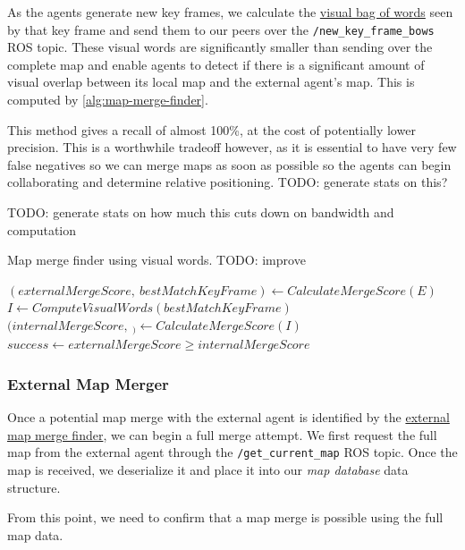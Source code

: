 As the agents generate new key frames, we calculate the \hyperref[sec:visual-bag-of-words]{visual bag of words} seen by that key frame and send them to our peers over the \texttt{/new\_key\_frame\_bows} ROS topic. These visual words are significantly smaller than sending over the complete map and enable agents to detect if there is a significant amount of visual overlap between its local map and the external agent's map. This is computed by \autoref{alg:map-merge-finder}.

This method gives a recall of almost 100\%, at the cost of potentially lower precision. This is a worthwhile tradeoff however, as it is essential to have very few false negatives so we can merge maps as soon as possible so the agents can begin collaborating and determine relative positioning. TODO: generate stats on this?

TODO: generate stats on how much this cuts down on bandwidth and computation

\begin{algorithm}
    \caption{Map merge finder using visual words. TODO: improve}
    \label{alg:map-merge-finder}
    \begin{algorithmic}[1]
        \State $(externalMergeScore,\ bestMatchKeyFrame) \gets CalculateMergeScore(E)$
        \State $I \gets ComputeVisualWords(bestMatchKeyFrame)$
        \State $(internalMergeScore,\ _) \gets CalculateMergeScore(I)$
        \State $success \gets externalMergeScore \geq internalMergeScore$
    \end{algorithmic}
\end{algorithm}

\subsubsection{External Map Merger}
\label{sec:external-map-merger}
Once a potential map merge with the external agent is identified by the \hyperref[sec:external-map-merge-finder]{external map merge finder}, we can begin a full merge attempt. We first request the full map from the external agent through the \texttt{/get\_current\_map} ROS topic. Once the map is received, we deserialize it and place it into our \textit{map database} data structure.

From this point, we need to confirm that a map merge is possible using the full map data.

